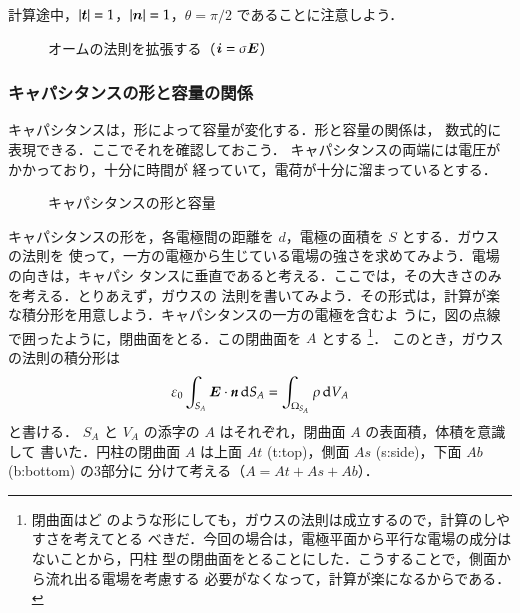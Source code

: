             計算途中，$|\boldsymbol{t}|=1$，$|\boldsymbol{n}|=1$，$\theta=\pi/2$ であることに注意しよう．
                \begin{figure}[hbt]
                    \begin{center}
                        \label{fig:OhmSlaw_IsigmaE}
                        \caption{オームの法則を拡張する（$\boldsymbol{i}=\sigma\boldsymbol{E}$）}
                    \end{center}
                \end{figure}

        \subsubsection{キャパシタンスの形と容量の関係}
        キャパシタンスは，形によって容量が変化する．形と容量の関係は，
        数式的に表現できる．ここでそれを確認しておこう．
        キャパシタンスの両端には電圧がかかっており，十分に時間が
        経っていて，電荷が十分に溜まっているとする．
                    \begin{figure}[hbt]
                        \begin{center}
                            \label{fig:capacita_youryou}
                            \caption{キャパシタンスの形と容量}
                        \end{center}
                    \end{figure}

        キャパシタンスの形を，各電極間の距離を $d$，電極の面積を $S$ とする．ガウスの法則を
        使って，一方の電極から生じている電場の強さを求めてみよう．電場の向きは，キャパシ
        タンスに垂直であると考える．ここでは，その大きさのみを考える．とりあえず，ガウスの
        法則を書いてみよう．その形式は，計算が楽な積分形を用意しよう．キャパシタンスの一方の電極を含むよ
        うに，図の点線で囲ったように，閉曲面をとる．この閉曲面を $A$ とする
            \footnote{
                閉曲面はど
                のような形にしても，ガウスの法則は成立するので，計算のしやすさを考えてとる
                べきだ．今回の場合は，電極平面から平行な電場の成分はないことから，円柱
                型の閉曲面をとることにした．こうすることで，側面から流れ出る電場を考慮する
                必要がなくなって，計算が楽になるからである．
            }．
        このとき，ガウスの法則の積分形は
            \begin{equation*}
                \varepsilon_{0}\int_{S_{A}}\boldsymbol{E}
                \cdot\textit{\textbf{n}}\,\mathrm{d} S_{A}
                =\int_{\Omega_{S_{A}}} \rho\,\mathrm{d} V_{A}
            \end{equation*}
        と書ける．
        $S_{A}$ と $V_{A}$ の添字の $A$ はそれぞれ，閉曲面 $A$ の表面積，体積を意識して
        書いた．円柱の閉曲面 $A$ は上面 $At$ (t:top)，側面 $As$ (s:side)，下面 $Ab$ (b:bottom) の3部分に
        分けて考える（$A=At+As+Ab$）．

